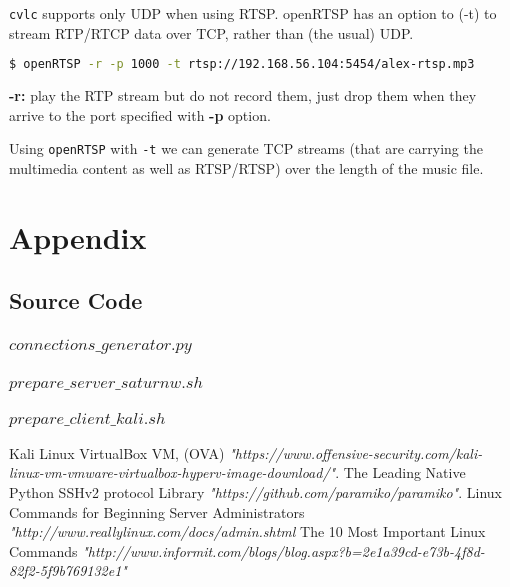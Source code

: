 \documentclass[a4paper]{article}
\begin{document}
\texttt{cvlc} supports only UDP when using RTSP. 
openRTSP has an option to (-t) to stream RTP/RTCP data over TCP, rather than (the usual) UDP.
\begin{lstlisting}[language=bash, numbers=none]
$ openRTSP -r -p 1000 -t rtsp://192.168.56.104:5454/alex-rtsp.mp3
\end{lstlisting}

\textbf{-r:} play the RTP stream but do not record them, just drop them when they arrive to the port specified with \textbf{-p} option.

Using \texttt{openRTSP} with \texttt{-t} we can generate TCP streams 
(that are carrying the multimedia content as well as RTSP/RTSP) over the length of the music file.


\section{Appendix}
\subsection{Source Code}
\subsubsection{$connections\_generator.py$}


\subsubsection{$prepare\_server\_saturnw.sh$}


\subsubsection{$prepare\_client\_kali.sh$}


\begin{thebibliography}{1}
 Kali Linux VirtualBox VM, (OVA) {\em "https://www.offensive-security.com/kali-linux-vm-vmware-virtualbox-hyperv-image-download/"}.
 The Leading Native Python SSHv2 protocol Library {\em"https://github.com/paramiko/paramiko"}.
 Linux Commands for Beginning Server Administrators {\em"http://www.reallylinux.com/docs/admin.shtml}
 The 10 Most Important Linux Commands {\em"http://www.informit.com/blogs/blog.aspx?b=2e1a39cd-e73b-4f8d-82f2-5f9b769132e1"}
\end{thebibliography}
\end{document}
